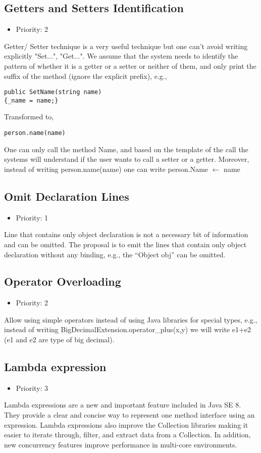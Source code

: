 \subsection{Getters and Setters Identification}
\begin{itemize}
	\item Priority: 2
\end{itemize}
Getter/ Setter technique is a very useful technique but one can't avoid writing explicitly "Set...", "Get...". We assume that the system needs to identify the pattern of whether it is a getter or a setter or neither  of them, and only print the suffix of the method (ignore the explicit prefix), e.g., 
\begin{lstlisting}
public SetName(string name)
{_name = name;}
\end{lstlisting}
Transformed to,
\begin{lstlisting}
person.name(name)
\end{lstlisting}
One can only call the method Name, and based on the template of the call the systems will understand if the user wants to call a setter or a getter. Moreover, instead of writing person.name(name) one can write person.Name $\leftarrow$ name
\subsection{Omit Declaration Lines}
\begin{itemize}
	\item Priority: 1
\end{itemize}
Line that contains only object declaration is not a necessary bit of information and can be omitted. The proposal is to emit the lines that contain only object declaration without any binding, e.g., the “Object obj” can be omitted.
\subsection{Operator Overloading}
\begin{itemize}
	\item Priority: 2
\end{itemize}
Allow using simple operators instead of using Java libraries for special types, e.g., instead of writing BigDecimalExtension.operator\_plus(x,y) we will write e1+e2 (e1 and e2 are type of big decimal).
\subsection{Lambda expression}
\begin{itemize}
	\item Priority: 3
\end{itemize}
Lambda expressions are a new and important feature included in Java SE 8. They provide a clear and concise way to represent one method interface using an expression. Lambda expressions also improve the Collection libraries making it easier to iterate through, filter, and extract data from a Collection. In addition, new concurrency features improve performance in multi-core environments.
